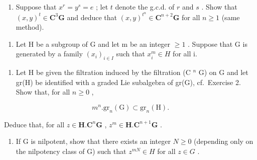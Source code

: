 \begin{enumerate}
\def\labelenumi{(\alph{enumi})}
\setcounter{enumi}{1}
\tightlist
\item
  Suppose that \(x^r = y^s = e\) ; let \(t\) denote the g.c.d. of \(r\) and \(s\) . Show that \((x, y)^t \in \mathbf{C}^3\mathbf{G}\) and deduce that \((x, y)^{t^n} \in \mathbf{C}^{n+2}\mathbf{G}\) for all \(n \geqslant 1\) (same method).
\end{enumerate}

\begin{enumerate}
\def\labelenumi{\arabic{enumi}.}
\setcounter{enumi}{10}
\tightlist
\item
  Let H be a subgroup of G and let m be an integer \(\geqslant 1\) . Suppose that G is generated by a family \((x_{i})_{i\in I}\) such that \(x_{i}^{m}\in H\) for all i.
\end{enumerate}

\begin{enumerate}
\def\labelenumi{(\alph{enumi})}
\tightlist
\item
  Let H be given the filtration induced by the filtration (C \(^{n}\) G) on G and let gr(H) be identified with a graded Lie subalgebra of gr(G), cf.~Exercise 2. Show that, for all \(n \geqslant 0\) ,
\end{enumerate}

\[
m ^ {n}. \mathrm{gr} _ {n} (\mathrm{G}) \subset \mathrm{gr} _ {n} (\mathrm{H}).
\]

Deduce that, for all \(z \in \mathbf{H}.\mathbf{C}^n\mathbf{G}\) , \(z^m \in \mathbf{H}.\mathbf{C}^{n+1}\mathbf{G}\) .

\begin{enumerate}
\def\labelenumi{(\alph{enumi})}
\setcounter{enumi}{1}
\tightlist
\item
  If G is nilpotent, show that there exists an integer \(N \geqslant 0\) (depending only on the nilpotency class of G) such that \(z^{mN} \in H\) for all \(z \in G\) .
\end{enumerate}

